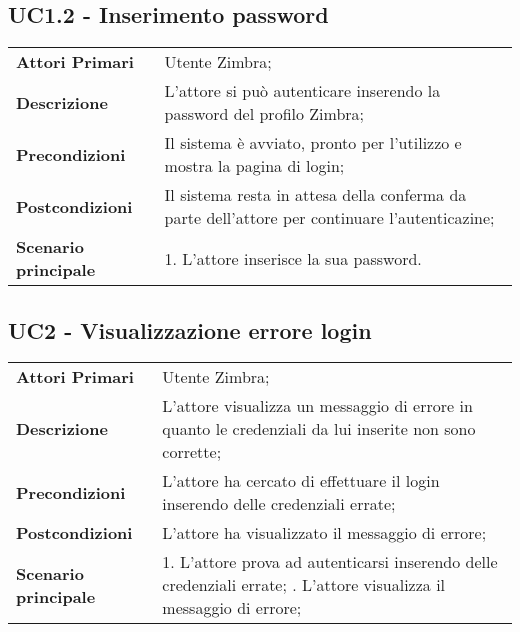 \subsection{UC1.2 - Inserimento password}
	\begin{center}
	\bgroup
	\def\arraystretch{1.8}     
	\begin{longtable}{  p{4cm} | p{9.5cm} } 
		\textbf{Attori Primari} & Utente Zimbra; \\ 
		\textbf{Descrizione} & L’attore si può autenticare inserendo la password del profilo Zimbra; \\ 
		\textbf{Precondizioni}  & Il sistema è avviato, pronto per l’utilizzo e mostra la pagina di login; \\
		\textbf{Postcondizioni} & Il sistema resta in attesa della conferma da parte dell'attore per continuare l'autenticazine;  \\ 
		\textbf{Scenario principale} & 
		1. L’attore inserisce la sua password.
	\end{longtable}
	\egroup
\end{center}

\subsection{UC2 - Visualizzazione errore login} \label{UC2}
	\begin{center}
	\bgroup
	\def\arraystretch{1.8}     
	\begin{longtable}{  p{4cm} | p{9.5cm} } 
		\textbf{Attori Primari} & Utente Zimbra; \\ 
		\textbf{Descrizione} &  L'attore visualizza un messaggio di errore in quanto le credenziali da lui inserite non sono corrette; \\ 
		\textbf{Precondizioni}  & L'attore ha cercato di effettuare il login inserendo delle credenziali errate; \\
		\textbf{Postcondizioni} & L'attore ha visualizzato il messaggio di errore;  \\ 
		\textbf{Scenario principale} & 
		1. L'attore prova ad autenticarsi inserendo delle credenziali errate; \newline
		2. L'attore visualizza il messaggio di errore;
	\end{longtable}
	\egroup
\end{center}


